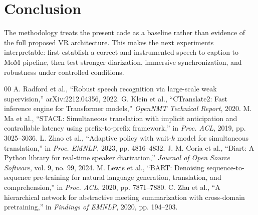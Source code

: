 \documentclass[conference]{IEEEtran}
\begin{document}
\section{Conclusion}
The methodology treats the present code as a baseline rather than evidence of the full proposed VR architecture. This makes the next experiments interpretable: first establish a correct and instrumented speech-to-caption-to-MoM pipeline, then test stronger diarization, immersive synchronization, and robustness under controlled conditions.

\begin{thebibliography}{00}
 A. Radford et al., ``Robust speech recognition via large-scale weak supervision,'' arXiv:2212.04356, 2022.
 G. Klein et al., ``CTranslate2: Fast inference engine for Transformer models,'' \textit{OpenNMT Technical Report}, 2020.
 M. Ma et al., ``STACL: Simultaneous translation with implicit anticipation and controllable latency using prefix-to-prefix framework,'' in \textit{Proc. ACL}, 2019, pp. 3025--3036.
 L. Zhao et al., ``Adaptive policy with wait-$k$ model for simultaneous translation,'' in \textit{Proc. EMNLP}, 2023, pp. 4816--4832.
 J. M. Coria et al., ``Diart: A Python library for real-time speaker diarization,'' \textit{Journal of Open Source Software}, vol. 9, no. 99, 2024.
 M. Lewis et al., ``BART: Denoising sequence-to-sequence pre-training for natural language generation, translation, and comprehension,'' in \textit{Proc. ACL}, 2020, pp. 7871--7880.
 C. Zhu et al., ``A hierarchical network for abstractive meeting summarization with cross-domain pretraining,'' in \textit{Findings of EMNLP}, 2020, pp. 194--203.
\end{thebibliography}
\end{document}
